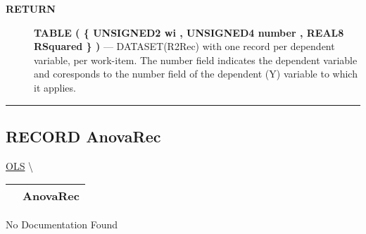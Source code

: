 \par
\begin{description}
\item [\colorbox{tagtype}{\color{white} \textbf{\textsf{RETURN}}}] \textbf{TABLE ( \{ UNSIGNED2 wi , UNSIGNED4 number , REAL8 RSquared \} )} --- DATASET(R2Rec) with one record per dependent variable, per work-item. The number field indicates the dependent variable and coresponds to the number field of the dependent (Y) variable to which it applies.
\end{description}




\rule{\linewidth}{0.5pt}
\subsection*{\textsf{\colorbox{headtoc}{\color{white} RECORD}
AnovaRec}}

\hypertarget{ecldoc:linearregression.ols.anovarec}{}
\hspace{0pt} \hyperlink{ecldoc:linearregression.ols}{OLS} \textbackslash 

{\renewcommand{\arraystretch}{1.5}
\begin{tabularx}{\textwidth}{|>{\raggedright\arraybackslash}l|X|}
\hline
\hspace{0pt}\mytexttt{\color{red} } & \textbf{AnovaRec} \\
\hline
\end{tabularx}
}

\par





No Documentation Found







